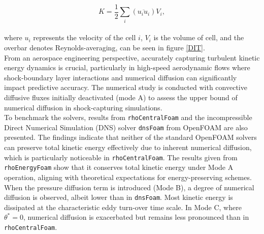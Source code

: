 \documentclass[a5paper]{sapthesis}
\begin{document}
	\begin{equation}
		K = \frac{1}{2} \sum_i  (\overline{u_{i} u_{i}}) V_i,
	\end{equation}
	\\
	where $u_i$ represents the velocity of the cell $i$, $V_i$ is the volume of cell, and the overbar denotes Reynolds-averaging, can be seen in figure \ref{DIT}.
	\\
	From an aerospace engineering perspective, accurately capturing turbulent kinetic energy dynamics is crucial, particularly in high-speed aerodynamic flows where shock-boundary layer interactions and numerical diffusion can significantly impact predictive accuracy. The numerical study is conducted with convective diffusive fluxes initially deactivated (mode A) to assess the upper bound of numerical diffusion in shock-capturing simulations.
	\\
	To benchmark the solvers, results from \texttt{rhoCentralFoam} and the incompressible Direct Numerical Simulation (DNS) solver \texttt{dnsFoam} from OpenFOAM are also presented. The findings indicate that neither of the standard OpenFOAM solvers can preserve total kinetic energy effectively due to inherent numerical diffusion, which is particularly noticeable in \texttt{rhoCentralFoam}. The results given from \texttt{rhoEnergyFoam} show that it conserves total kinetic energy under Mode A operation, aligning with theoretical expectations for energy-preserving schemes.
	\\
	When the pressure diffusion term is introduced (Mode B), a degree of numerical diffusion is observed, albeit lower than in \texttt{dnsFoam}. Most kinetic energy is dissipated at the characteristic eddy turn-over time scale. In Mode C, where $\theta^* = 0$, numerical diffusion is exacerbated but remains less pronounced than in \texttt{rhoCentralFoam}. 
	
\end{document}
